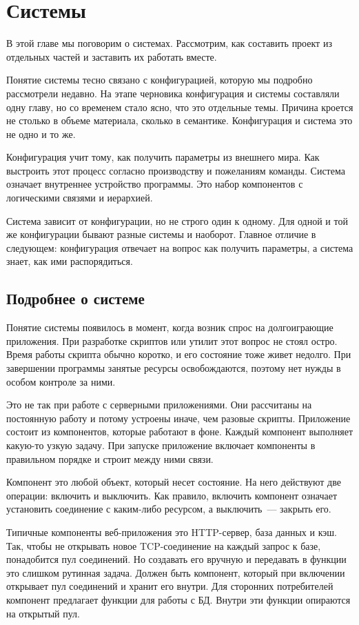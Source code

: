 \chapter{Системы}

В этой главе мы поговорим о системах. Рассмотрим, как составить проект из
отдельных частей и заставить их работать вместе.

Понятие системы тесно связано с конфигурацией, которую мы подробно рассмотрели
недавно. На этапе черновика конфигурация и системы составляли одну главу, но со
временем стало ясно, что это отдельные темы. Причина кроется не столько в объеме
материала, сколько в семантике. Конфигурация и система это не одно и то же.

Конфигурация учит тому, как получить параметры из внешнего мира. Как выстроить
этот процесс согласно производству и пожеланиям команды. Система означает
внутреннее устройство программы. Это набор компонентов с логическими связями и
иерархией.

Система зависит от конфигурации, но не строго один к одному. Для одной и той же
конфигурации бывают разные системы и наоборот. Главное отличие в следующем:
конфигурация отвечает на вопрос как получить параметры, а система знает, как ими
распорядиться.

\section{Подробнее о системе}

Понятие системы появилось в момент, когда возник спрос на долгоиграющие
приложения. При разработке скриптов или утилит этот вопрос не стоял остро. Время
работы скрипта обычно коротко, и его состояние тоже живет недолго. При
завершении программы занятые ресурсы освобождаются, поэтому нет нужды в особом
контроле за ними.

Это не так при работе с серверными приложениями. Они рассчитаны на постоянную
работу и потому устроены иначе, чем разовые скрипты. Приложение состоит из
компонентов, которые работают в фоне. Каждый компонент выполняет какую-то узкую
задачу. При запуске приложение включает компоненты в правильном порядке и строит
между ними связи.

Компонент это любой объект, который несет состояние. На него действуют две
операции: включить и выключить. Как правило, включить компонент означает
установить соединение с каким-либо ресурсом, а выключить~--- закрыть его.

Типичные компоненты веб-приложения это HTTP-сервер, база данных и кэш. Так,
чтобы не открывать новое TCP-соединение на каждый запрос к базе, понадобится пул
соединений. Но создавать его вручную и передавать в функции это слишком рутинная
задача. Должен быть компонент, который при включении открывает пул соединений и
хранит его внутри. Для сторонних потребителей компонент предлагает функции для
работы с БД. Внутри эти функции опираются на открытый пул.

